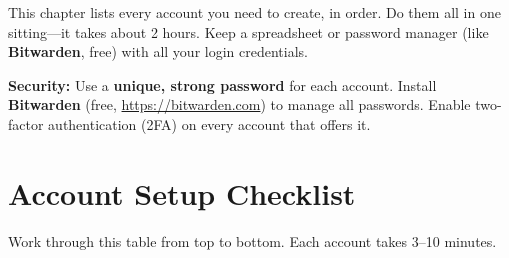 \documentclass[12pt, letterpaper, oneside]{book}
\begin{document}
This chapter lists every account you need to create, in order. Do them all in one sitting---it takes about 2 hours. Keep a spreadsheet or password manager (like \textbf{Bitwarden}, free) with all your login credentials.

\begin{warningbox}
\textbf{Security:} Use a \textbf{unique, strong password} for each account. Install \textbf{Bitwarden} (free, \url{https://bitwarden.com}) to manage all passwords. Enable two-factor authentication (2FA) on every account that offers it.
\end{warningbox}

\section{Account Setup Checklist}

Work through this table from top to bottom. Each account takes 3--10 minutes.
\end{document}
